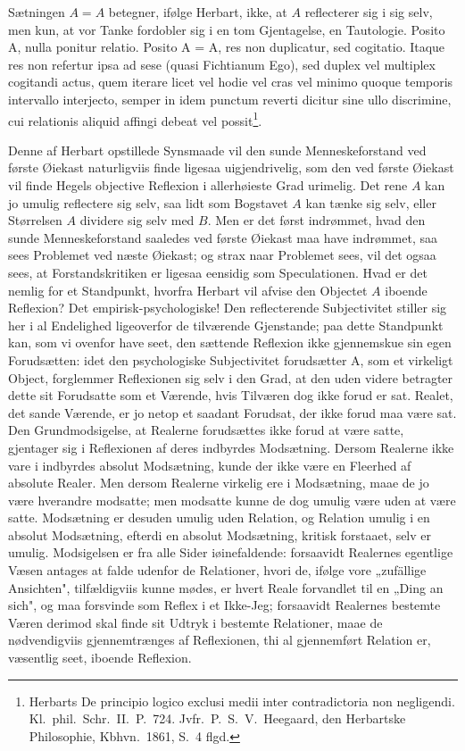 \documentclass[12pt]{book}
\newcommand{\opage}[1]{\marginnote{\footnotesize\textit{[#1]}}}
\begin{document}
Sætningen $A = A$ betegner, ifølge Herbart, ikke, at $A$ reflecterer sig i sig selv,
men kun, at vor Tanke fordobler sig i en tom Gjentagelse, en Tautologie. Posito A,
nulla ponitur relatio. Posito A = A, res non duplicatur, sed cogitatio. Itaque res
non refertur ipsa ad sese (quasi Fichtianum Ego), sed duplex vel multiplex cogitandi
\opage{72} actus, quem iterare licet vel hodie vel cras vel minimo quoque temporis intervallo
interjecto, semper in idem punctum reverti dicitur sine ullo discrimine, cui
relationis aliquid affingi debeat vel possit\footnote{Herbarts De principio logico
exclusi medii inter contradictoria non negligendi. Kl.\ phil.\ Schr.\ II.\ P.~724.
Jvfr.\ P.~S.~V.\ Heegaard, den Herbartske Philosophie, Kbhvn.\ 1861, S.~4 flgd.}.

Denne af Herbart opstillede Synsmaade vil den sunde Menneskeforstand ved første
Øiekast naturligviis finde ligesaa uigjendrivelig, som den ved første Øiekast vil
finde Hegels objective Reflexion i allerhøieste Grad urimelig. Det rene $A$ kan jo
umulig reflectere sig selv, saa lidt som Bogstavet $A$ kan tænke sig selv, eller
Størrelsen $A$ dividere sig selv med $B$. Men er det først indrømmet, hvad den sunde
Menneskeforstand saaledes ved første Øiekast maa have indrømmet, saa sees Problemet
ved næste Øiekast; og strax naar Problemet sees, vil det ogsaa sees, at
Forstandskritiken er ligesaa eensidig som Speculationen. Hvad er det nemlig for et
Standpunkt, hvorfra Herbart vil afvise den Objectet $A$ iboende Reflexion? Det
empirisk-psychologiske! Den reflecterende Subjectivitet stiller sig her i al
Endelighed ligeoverfor de tilværende Gjenstande; paa dette Standpunkt kan, som vi
ovenfor have seet, den sættende Reflexion ikke gjennemskue sin egen Forudsætten: idet
den psychologiske Subjectivitet forudsætter A, som et virkeligt Object, forglemmer
Reflexionen sig selv i den Grad, at den uden videre betragter dette sit Forudsatte
som et Værende, hvis Tilværen dog ikke forud er sat. Realet, det sande Værende, er jo
netop et saadant Forudsat, der ikke forud maa være sat. Den Grundmodsigelse, at
Realerne forudsættes ikke forud at være satte, gjentager sig i Reflexionen af deres
indbyrdes Modsætning. Dersom Realerne ikke vare i indbyrdes absolut Modsætning, kunde
der ikke være en Fleerhed af absolute Realer. Men dersom Realerne virkelig ere i
Modsætning, maae de jo være hverandre modsatte; men modsatte kunne de
\opage{73} dog umulig være uden at være satte. Modsætning er desuden umulig uden Relation, og
Relation umulig i en absolut Modsætning, efterdi en absolut Modsætning, kritisk
forstaaet, selv er umulig. Modsigelsen er fra alle Sider iøinefaldende: forsaavidt
Realernes egentlige Væsen antages at falde udenfor de Relationer, hvori de, ifølge
vore „zufällige Ansichten", tilfældigviis kunne mødes, er hvert Reale forvandlet til
en „Ding an sich", og maa forsvinde som Reflex i et Ikke-Jeg; forsaavidt Realernes
bestemte Væren derimod skal finde sit Udtryk i bestemte Relationer, maae de
nødvendigviis gjennemtrænges af Reflexionen, thi al gjennemført Relation er,
væsentlig seet, iboende Reflexion.
\end{document}
